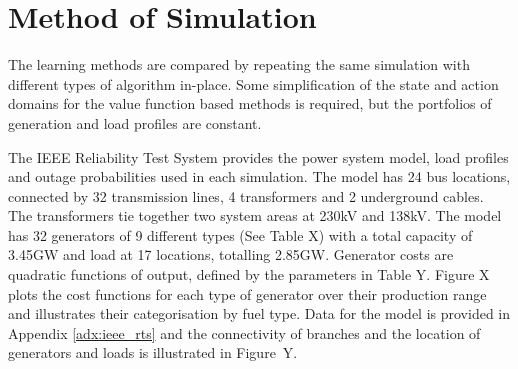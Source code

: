 \section{Method of Simulation}
The learning methods are compared by repeating the same simulation with
different types of algorithm in-place.  Some simplification of the state
and action domains for the value function based methods is required, but the
portfolios of generation and load profiles are constant.

The IEEE Reliability Test System \cite{ieee79rts} provides the power system
model, load profiles and outage probabilities used in each simulation.  The
model has 24 bus locations, connected by 32 transmission lines, 4 transformers
and 2 underground cables.  The transformers tie together two system areas at
230kV and 138kV.  The model has 32 generators of 9 different types (See Table
X) with a total capacity of 3.45GW and load at 17 locations, totalling 2.85GW.
Generator costs are quadratic functions of output, defined by the parameters in
Table Y.  Figure X plots the cost functions for each type of generator over
their production range and illustrates their categorisation by fuel type.  Data
for the model is provided in Appendix \ref{adx:ieee_rts} and the connectivity
of branches and the location of generators and loads is illustrated in
Figure~Y.

